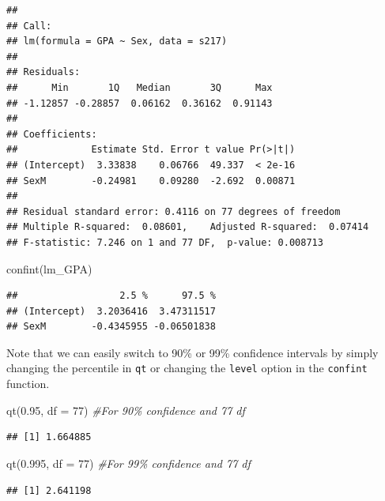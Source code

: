 \documentclass[
]{book}
\newenvironment{Shaded}{\begin{snugshade}}{\end{snugshade}}
\newcommand{\AttributeTok}[1]{\textcolor[rgb]{0.77,0.63,0.00}{#1}}
\newcommand{\CommentTok}[1]{\textcolor[rgb]{0.56,0.35,0.01}{\textit{#1}}}
\newcommand{\DecValTok}[1]{\textcolor[rgb]{0.00,0.00,0.81}{#1}}
\newcommand{\FloatTok}[1]{\textcolor[rgb]{0.00,0.00,0.81}{#1}}
\newcommand{\FunctionTok}[1]{\textcolor[rgb]{0.00,0.00,0.00}{#1}}
\newcommand{\NormalTok}[1]{#1}
\begin{document}
\begin{verbatim}
## 
## Call:
## lm(formula = GPA ~ Sex, data = s217)
## 
## Residuals:
##      Min       1Q   Median       3Q      Max 
## -1.12857 -0.28857  0.06162  0.36162  0.91143 
## 
## Coefficients:
##             Estimate Std. Error t value Pr(>|t|)
## (Intercept)  3.33838    0.06766  49.337  < 2e-16
## SexM        -0.24981    0.09280  -2.692  0.00871
## 
## Residual standard error: 0.4116 on 77 degrees of freedom
## Multiple R-squared:  0.08601,    Adjusted R-squared:  0.07414 
## F-statistic: 7.246 on 1 and 77 DF,  p-value: 0.008713
\end{verbatim}

\begin{Shaded}
\begin{Highlighting}[]
\FunctionTok{confint}\NormalTok{(lm\_GPA)}
\end{Highlighting}
\end{Shaded}

\begin{verbatim}
##                  2.5 %      97.5 %
## (Intercept)  3.2036416  3.47311517
## SexM        -0.4345955 -0.06501838
\end{verbatim}

Note that we can easily switch to 90\% or 99\% confidence intervals by simply
changing the percentile in \texttt{qt} or changing the \texttt{level} option in the
\texttt{confint} function.

\begin{Shaded}
\begin{Highlighting}[]
\FunctionTok{qt}\NormalTok{(}\FloatTok{0.95}\NormalTok{, }\AttributeTok{df =} \DecValTok{77}\NormalTok{) }\CommentTok{\#For 90\% confidence and 77 df}
\end{Highlighting}
\end{Shaded}

\begin{verbatim}
## [1] 1.664885
\end{verbatim}

\begin{Shaded}
\begin{Highlighting}[]
\FunctionTok{qt}\NormalTok{(}\FloatTok{0.995}\NormalTok{, }\AttributeTok{df =} \DecValTok{77}\NormalTok{) }\CommentTok{\#For 99\% confidence and 77 df}
\end{Highlighting}
\end{Shaded}

\begin{verbatim}
## [1] 2.641198
\end{verbatim}
\end{document}

